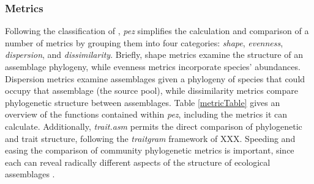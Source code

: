 \documentclass[11pt]{article} %
\begin{document}
\subsubsection*{Metrics}
Following the classification of \textcite{Pearse2014review},
\emph{pez} simplifies the calculation and comparison of a number of
metrics by grouping them into four categories: \emph{shape},
\emph{evenness}, \emph{dispersion}, and \emph{dissimilarity}. Briefly,
shape metrics examine the structure of an assemblage phylogeny, while
evenness metrics incorporate species’ abundances. Dispersion metrics
examine assemblages given a phylogeny of species that could occupy
that assemblage (the source pool), while dissimilarity metrics compare
phylogenetic structure between assemblages. Table \ref{metricTable}
gives an overview of the functions contained within \emph{pez},
including the metrics it can calculate. Additionally, \emph{trait.asm}
permits the direct comparison of phylogenetic and trait structure,
following the \emph{traitgram} framework of XXX. Speeding and easing
the comparison of community phylogenetic metrics is important, since
each can reveal radically different aspects of the structure of
ecological assemblages \autocite{Cadotte2010}.
\end{document}
